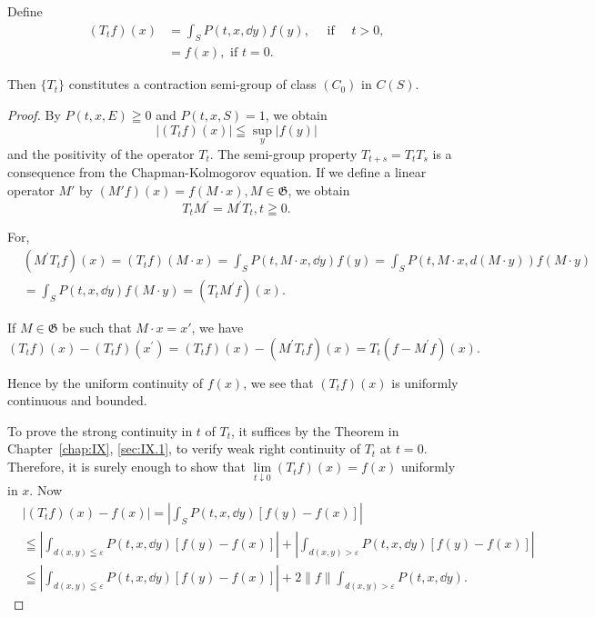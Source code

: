 Define 
\begin{equation}\label{eq:XIII.5.4}
\begin{aligned} (T _{t} f) (x) & = \int_{S} P (t, x, \dd y) f (y), \quad \text{ if } \quad t > 0, \\ & = f (x), \text{ if } t = 0. \end{aligned}
\end{equation}

Then $\{T_t\}$ constitutes a contraction semi-group of class $(C_0)$ in $C(S)$. 

\begin{proof}
 By $P(t, x, E) \geqq 0$ and $P(t, x, S) = 1$, we obtain 
\[
\left| \left(T _{t} f\right) (x) \right| \leqq \sup\limits _{y} | f (y) |
\]
and the positivity of the operator $T_{t}$. The semi-group property $T_{t+s} = T_{t}T_{s}$ is a consequence from the Chapman-Kolmogorov equation. If we define a linear operator $M'$ by $(M'f)(x) = f(M\cdot x), M \in \mathfrak{G}$, we obtain 
\[
T _{t} M ^{\prime} = M ^{\prime} T _{t}, t \geqq 0. \]

For, 
\begin{equation}\label{eq:XIII.5.5}
\begin{aligned}
&(M ^{\prime} T _{t} f) (x)  = (T _{t} f) (M \cdot x) = \int_{S} P (t, M \cdot x, \dd y) f (y) = \int_{S} P (t, M \cdot x, d (M \cdot y)) f (M \cdot y) \\
&= \int_{S} P (t, x, \dd y) f (M \cdot y) = (T _{t} M ^{\prime} f) (x).
\end{aligned}
\end{equation}

If $M \in \mathfrak{G}$ be such that $M \cdot x = x'$, we have 
\[
\left(T _{t} f\right) (x) - \left(T _{t} f\right) \left(x ^{\prime}\right) = \left(T _{t} f\right) (x) - \left(M ^{\prime} T _{t} f\right) (x) = T _{t} \left(f - M ^{\prime} f\right) (x).
\]

Hence by the uniform continuity of $f(x)$, we see that $(T_{t}f)(x)$ is uniformly continuous and bounded. 


To prove the strong continuity in $t$ of $T_{t}$, it suffices by the Theorem in Chapter~\ref{chap:IX}, \ref{sec:IX.1}, to verify weak right continuity of $T_{t}$ at $t = 0$. Therefore, it is surely enough to show that $\lim\limits_{t\downarrow0}(T_{t}f)(x)=f(x)$ uniformly in $x$. Now 
\[
\begin{aligned} & {\left| \left(T _{t} f\right) (x) - f (x) \right| = \left| \int_{S} P (t, x, \dd y) [ f (y) - f (x) ] \right|} \\ & {\leqq \left| \int_{d (x, y) \leqq \varepsilon} P (t, x, \dd y) [ f (y) - f (x) ] \right| + \left| \int_{d (x, y) > \varepsilon} P (t, x, \dd y) [ f (y) - f (x) ] \right|} \\ & {\leqq \left| \int_{d (x, y) \leqq \varepsilon} P (t, x, \dd y) [ f (y) - f (x) ] \right| + 2 \| f \| \int_{d (x, y) > \varepsilon} P (t, x, \dd y).} \end{aligned}
\]


\end{proof}
